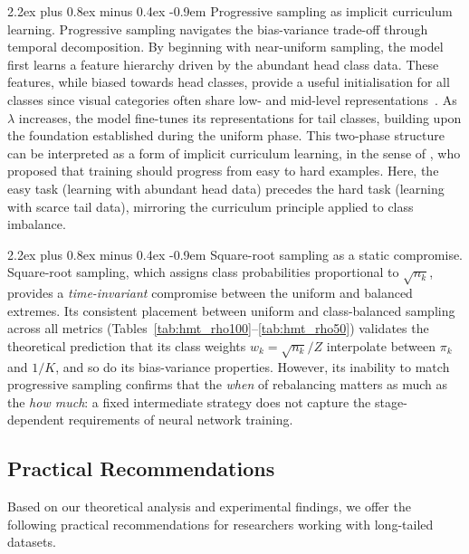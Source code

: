 \documentclass[12pt,a4paper]{article}
\makeatletter
\renewcommand{\paragraph}{\@startsection{paragraph}{4}{\z@}%
  {2.2ex plus 0.8ex minus 0.4ex}%
  {-0.9em}%
  {\normalfont\normalsize\bfseries}}
\makeatother
\begin{document}
\paragraph{Progressive sampling as implicit curriculum learning.} Progressive sampling navigates the bias-variance trade-off through temporal decomposition. By beginning with near-uniform sampling, the model first learns a feature hierarchy driven by the abundant head class data. These features, while biased towards head classes, provide a useful initialisation for all classes since visual categories often share low- and mid-level representations~\citep{zhang2023deep}. As $\lambda$ increases, the model fine-tunes its representations for tail classes, building upon the foundation established during the uniform phase. This two-phase structure can be interpreted as a form of implicit curriculum learning, in the sense of \citet{bengio2009curriculum}, who proposed that training should progress from easy to hard examples. Here, the easy task (learning with abundant head data) precedes the hard task (learning with scarce tail data), mirroring the curriculum principle applied to class imbalance.

\paragraph{Square-root sampling as a static compromise.} Square-root sampling, which assigns class probabilities proportional to $\sqrt{n_k}$, provides a \emph{time-invariant} compromise between the uniform and balanced extremes. Its consistent placement between uniform and class-balanced sampling across all metrics (Tables~\ref{tab:hmt_rho100}--\ref{tab:hmt_rho50}) validates the theoretical prediction that its class weights $w_k = \sqrt{n_k}/Z$ interpolate between $\pi_k$ and $1/K$, and so do its bias-variance properties. However, its inability to match progressive sampling confirms that the \emph{when} of rebalancing matters as much as the \emph{how much}: a fixed intermediate strategy does not capture the stage-dependent requirements of neural network training.

\subsection{Practical Recommendations}

Based on our theoretical analysis and experimental findings, we offer the following practical recommendations for researchers working with long-tailed datasets.
\end{document}
